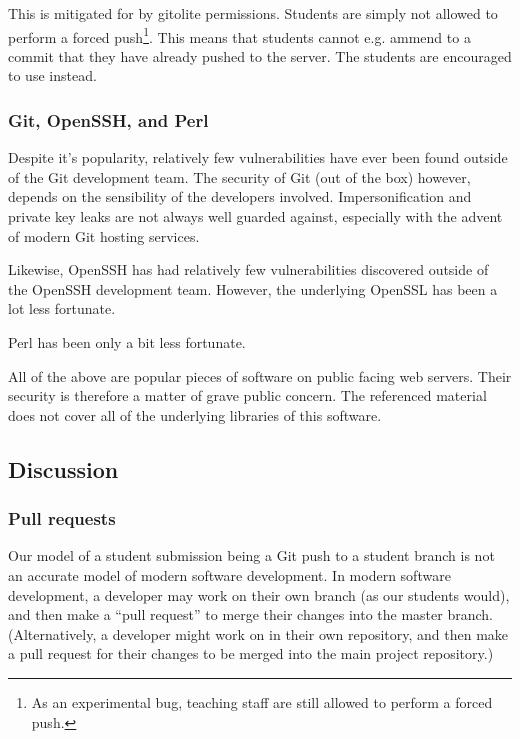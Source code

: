 This is mitigated for by gitolite permissions. Students are simply not allowed
to perform a forced push\footnote{As an experimental bug, teaching staff are
still allowed to perform a forced push.}. This means that students cannot e.g.
ammend to a commit that they have already pushed to the server. The students
are encouraged to use \cite{man-1-git-revert} instead.

\subsubsection{Git, OpenSSH, and Perl}

Despite it's popularity, relatively few vulnerabilities have ever been found
outside of the Git development team\cite{cvedetails-com-2014a}. The security of
Git (out of the box) however, depends on the sensibility of the developers
involved. Impersonification and private key leaks are not always well guarded
against\cite{gerwitz-2013}, especially with the advent of modern Git hosting
services\cite{homakov-2012,huang-2013,homakov-2014}.

Likewise, OpenSSH has had relatively few vulnerabilities discovered outside of
the OpenSSH development team\cite{cvedetails-com-2014b}. However, the
underlying OpenSSL has been a lot less fortunate\cite{cvedetails-com-2014c}.

Perl has been only a bit less fortunate\cite{cvedetails-com-2014d}.

All of the above are popular pieces of software on public facing web servers.
Their security is therefore a matter of grave public concern. The referenced
material does not cover all of the underlying libraries of this software.

\subsection{Discussion}

\subsubsection{Pull requests}

Our model of a student submission being a Git push to a student branch is not
an accurate model of modern software development. In modern software
development, a developer may work on their own branch (as our students would),
and then make a ``pull request'' to merge their changes into the master branch.
(Alternatively, a developer might work on in their own repository, and then
make a pull request for their changes to be merged into the main project
repository\cite{bird-et-al-2009}.)

